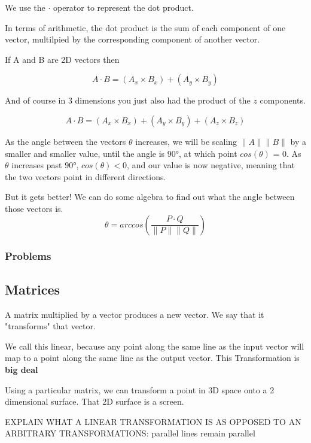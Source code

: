 \documentclass[11pt]{article}
\begin{document}
We use the \( \cdot \) operator to represent the dot product.

In terms of arithmetic, the dot product is the sum of each component of one vector, multilpied by the corresponding component of another vector. 

If A and B are 2D vectors then

\begin{equation*}
  A \cdot B = (A_x \times B_x) + (A_y \times B_y)
\end{equation*}

And of course in 3 dimensions you just also had the product of the \(z\) components.

\begin{equation*}
  A \cdot B = (A_x \times B_x) + (A_y \times B_y) + (A_z \times B_z)
\end{equation*}

As the angle between the vectors \(\theta\) increases, we will be scaling \( \lVert A \rVert \lVert B \rVert \) by a smaller and smaller value, until the angle is \(\ang{90}\), at which point \(cos(\theta)\) = 0. As \(\theta\) increases past \(\ang{90}\), \(cos(\theta) < 0\), and our value is now negative, meaning that the two vectors point in different directions.

But it gets better! We can do some algebra to find out what the angle between those vectors is.
  \begin{equation*}
  \theta = arccos\left( \frac{P \cdot Q}{\lVert P \rVert \lVert Q \rVert} \right)
  \end{equation*}
  
\subsubsection{Problems}
\label{sec-9-1-1}
\subsection{Matrices}
\label{sec-9-2}
A matrix multiplied by a vector produces a new vector. We say that it "transforms" that vector.

We call this linear, because any point along the same line as the input vector will map to a point along the same line as the output vector. This Transformation is \textbf{big deal}

Using a particular matrix, we can transform a point in 3D space onto a 2 dimensional surface. That 2D surface is a screen. 

EXPLAIN WHAT A LINEAR TRANSFORMATION IS AS OPPOSED TO AN ARBITRARY TRANSFORMATIONS: parallel lines remain parallel
\end{document}
